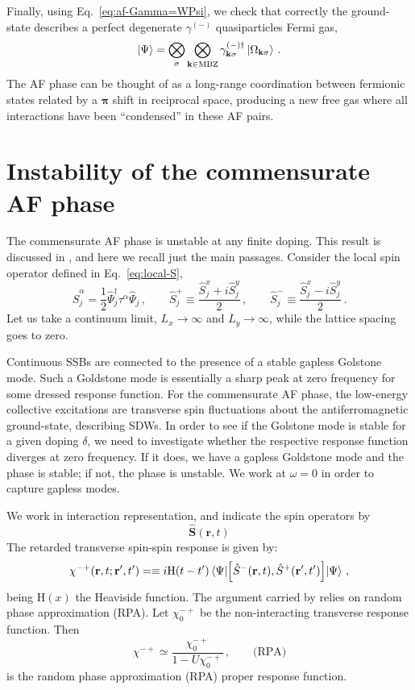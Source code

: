 Finally, using Eq.~\eqref{eq:af-Gamma=WPsi}, we check that correctly the ground-state describes a perfect degenerate $\gamma^{(-)}$ quasiparticles Fermi gas,
\begin{equation}\label{appeq:af-hm-gs-4}
	\ket{\Psi} = \bigotimes_\sigma \bigotimes_{\mathbf{k}\in\mathrm{MBZ}} \gamma_{\mathbf{k}\sigma}^{(-)\dagger} \ket{\Omega_{\mathbf{k}\sigma}} \, .
\end{equation}
The AF phase can be thought of as a long-range coordination between fermionic states related by a $\bm{\pi}$ shift in reciprocal space, producing a new free gas where all interactions have been ``condensed'' in these AF pairs.

\section{Instability of the commensurate AF phase}\label{appsubsec:af-instability}

The commensurate AF phase is unstable at any finite doping. This result is discussed in \cite{singh1990collective,singh1991doped}, and here we recall just the main passages. Consider the local spin operator defined in Eq.~\eqref{eq:local-S},
\[
	\hat S_j^\alpha = \frac{1}{2} \hat \Psi_j^\dagger \tau^\alpha \hat \Psi_j \, ,
	\qquad
	\hat S_j^+ \equiv \frac{\hat S_j^x + i\hat S_j^y}{2} \, ,
	\qquad
	\hat S_j^- \equiv \frac{\hat S_j^x - i\hat S_j^y}{2} \, .
\]
Let us take a continuum limit, $L_x \to \infty$ and $L_y \to \infty$, while the lattice spacing goes to zero.

Continuous SSBs are connected to the presence of a stable gapless Golstone mode. Such a Goldstone mode is essentially a sharp peak at zero frequency for some dressed response function. For the commensurate AF phase, the low-energy collective excitations are transverse spin fluctuations about the antiferromagnetic ground-state, describing SDWs. In order to see if the Golstone mode is stable for a given doping $\delta$, we need to investigate whether the respective response function diverges at zero frequency. If it does, we have a gapless Goldstone mode and the phase is stable; if not, the phase is unstable. We work at $\omega=0$ in order to capture gapless modes.

We work in interaction representation, and indicate the spin operators by
\[
	\hat{\mathbf{S}}(\mathbf{r},t)
\]
The retarded transverse spin-spin response is given by:
\[
	\chi^{-+}(\mathbf{r},t;\mathbf{r}',t') =\equiv i \mathrm{H}(t-t') \mel{\Psi}{\comm{\hat S^-(\mathbf{r},t)}{\hat S^+(\mathbf{r}',t')}}{\Psi} \, ,
\]
being $\mathrm{H}(x)$ the Heaviside function. The argument carried by \citeauthor{singh1990collective} relies on random phase approximation (RPA). Let $\chi_0^{-+}$ be the non-interacting transverse response function. Then
\[
	\chi^{-+} \simeq \frac{\chi_0^{-+}}{1-U\chi_0^{-+}} \, ,
	\qquad
	\text{(RPA)}
\]
is the random phase approximation (RPA) proper response function.

